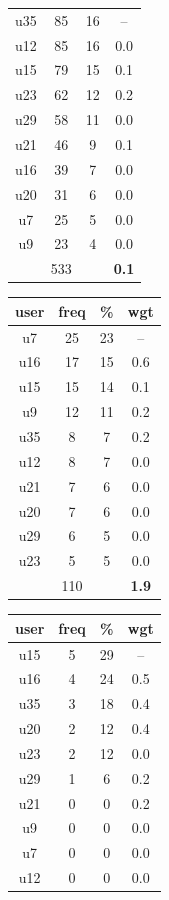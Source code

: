 \begin{table}
\begin{tabular}{ |c|c|c|c| }
	\hline
	u35 & 85 & 16 & -- \\
	u12 & 85 & 16 & 0.0 \\
	u15 & 79 & 15 & 0.1 \\
	u23 & 62 & 12 & 0.2 \\
	u29 & 58 & 11 & 0.0 \\
	u21 & 46 & 9 & 0.1 \\
	u16 & 39 & 7 & 0.0 \\
	u20 & 31 & 6 & 0.0 \\
	u7 & 25 & 5 & 0.0 \\
	u9 & 23 & 4 & 0.0 \\
	 & 533 & & \textbf{0.1} \\
	\hline
\end{tabular}
\begin{tabular}{ |c|c|c|c| }
	\hline
	\textbf{user} & \textbf{freq} & \textbf{\%} & \textbf{wgt} \\
	\hline
	u7 & 25 & 23 & -- \\
	u16 & 17 & 15 & 0.6 \\
	u15 & 15 & 14 & 0.1 \\
	u9 & 12 & 11 & 0.2 \\
	u35 & 8 & 7 & 0.2 \\
	u12 & 8 & 7 & 0.0 \\
	u21 & 7 & 6 & 0.0 \\
	u20 & 7 & 6 & 0.0 \\
	u29 & 6 & 5 & 0.0 \\
	u23 & 5 & 5 & 0.0 \\
	 & 110 & & \textbf{1.9} \\
	\hline
\end{tabular}
\begin{tabular}{ |c|c|c|c| }
	\hline
	\textbf{user} & \textbf{freq} & \textbf{\%} & \textbf{wgt} \\
	\hline
	u15 & 5 & 29 & -- \\
	u16 & 4 & 24 & 0.5 \\
	u35 & 3 & 18 & 0.4 \\
	u20 & 2 & 12 & 0.4 \\
	u23 & 2 & 12 & 0.0 \\
	u29 & 1 & 6 & 0.2 \\
	u21 & 0 & 0 & 0.2 \\
	u9 & 0 & 0 & 0.0 \\
	u7 & 0 & 0 & 0.0 \\
	u12 & 0 & 0 & 0.0 \\

\end{tabular}
\end{table}
